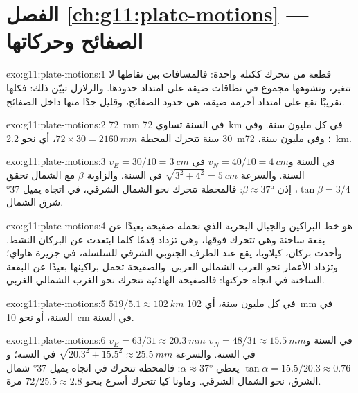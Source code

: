 \section*{الفصل \ref{ch:g11:plate-motions} --- الصفائح وحركاتها}

\begin{solution}{exo:g11:plate-motions:1}
 قطعة من  تتحرك ككتلة واحدة: فالمسافات
بين نقاطها لا تتغير، وتشوهها مجموع في
نطاقات ضيقة على امتداد حدودها. والزلازل تبيّن ذلك: فكلها تقريبًا
تقع على امتداد أحزمة ضيقة، هي حدود الصفائح، وقليل جدًا منها داخل
الصفائح.
\end{solution}

\begin{solution}{exo:g11:plate-motions:2}
\qty{72}{mm} في السنة تساوي \qty{72}{km} في كل مليون سنة. وفي 30 سنة تتحرك المحطة
$72 \times 30 = \qty{2160}{mm}$، أي نحو \qty{2.2}{m}؛ وفي مليون سنة،
\qty{72}{km}.
\end{solution}

\begin{solution}{exo:g11:plate-motions:3}
$v_E = 30/10 = \qty{3}{cm}$ في السنة و$v_N = 40/10 = \qty{4}{cm}$ في السنة.
والسرعة $\sqrt{3^2 + 4^2} = \qty{5}{cm}$ في السنة. والزاوية $\beta$ مع
الشمال تحقق $\tan\beta = 3/4$، إذن $\beta \approx \ang{37}$: فالمحطة
تتحرك نحو الشمال الشرقي، في اتجاه يميل \ang{37} شرق الشمال.
\end{solution}

\begin{solution}{exo:g11:plate-motions:4}
 هو خط البراكين والجبال البحرية الذي تحمله صفيحة
بعيدًا عن بقعة ساخنة وهي تتحرك فوقها، وهي تزداد قِدمًا كلما ابتعدت عن
البركان النشط. وأحدث بركان، كيلاويا، يقع عند الطرف الجنوبي
الشرقي للسلسلة، في جزيرة هاواي؛ وتزداد الأعمار
نحو الغرب الشمالي الغربي. والصفيحة تحمل براكينها بعيدًا عن
البقعة الساخنة في اتجاه حركتها: فالصفيحة الهادئية تتحرك نحو
الغرب الشمالي الغربي.
\end{solution}

\begin{solution}{exo:g11:plate-motions:5}
$519/5.1 \approx \qty{102}{km}$ في كل مليون سنة، أي \qty{102}{mm} في
السنة، أو نحو \qty{10}{cm} في السنة.
\end{solution}

\begin{solution}{exo:g11:plate-motions:6}
$v_E = 63/31 \approx \qty{20.3}{mm}$ في السنة و$v_N = 48/31 \approx
\qty{15.5}{mm}$ في السنة. والسرعة $\sqrt{20.3^2 + 15.5^2} \approx
\qty{25.5}{mm}$ في السنة؛ و$\tan\alpha = 15.5/20.3 \approx 0.76$ يعطي $\alpha
\approx \ang{37}$: فالمحطة تتحرك في اتجاه يميل \ang{37} شمال الشرق، نحو
الشمال الشرقي. وماونا كيا تتحرك أسرع بنحو $72/25.5 \approx 2.8$ مرة.
\end{solution}

